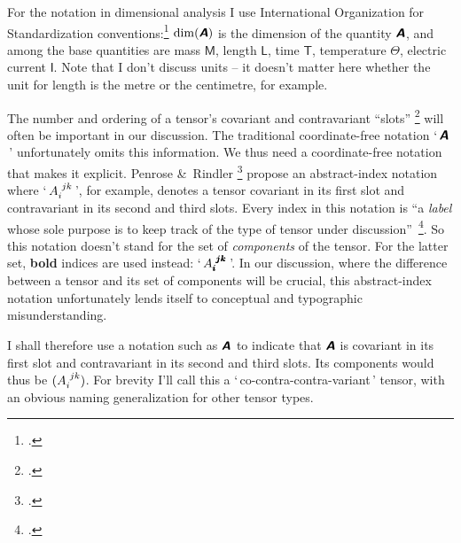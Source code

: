 \documentclass[a4paper,12pt,onecolumn,oneside,article,british]{memoir}
\makeatletter
\newcommand*{\defquote}[1]{`\,#1\,'}
\newcommand*{\mathte}[1]{\textbf{\textit{\textsf{#1}}}}
\newcommand*{\citep}{\footcites}
\newcommand*{\amp}{\&}
\newcommand*{\sect}{\S}%
\newcommand*{\q}{}%
\DeclareRobustCommand*{\q}{%
  \mathbin{\mathpalette\bigcdot@{}}%
}
\newcommand*{\bigcdot@scalefactor}{0.7}
\newcommand*{\bigcdot@widthfactor}{1.5}
\newcommand*{\bigcdot@}[2]{%
  \sbox0{$#1\vcenter{}$}%
  \sbox2{$#1\cdot\m@th$}%
  \hbox to \bigcdot@widthfactor\wd2{%
    \hfil
    \raise\ht0\hbox{%
      \scalebox{\bigcdot@scalefactor}{%
        \lower\ht0\hbox{$#1\bullet\m@th$}%
      }%
    }%
    \hfil
  }%
}
\newcommand*{\Le}{\textsf{L}}
\newcommand*{\Ti}{\textsf{T}}
\newcommand*{\Ma}{\textsf{M}}
\newcommand*{\Te}{\Theta}
\newcommand*{\Cu}{\textsf{I}}
\newcommand*{\yA}{\mathte{A}}
\renewcommand*{\i}{\indices}
\makeatother
\begin{document}
\bigskip

For the notation in dimensional analysis I use International Organization
for Standardization conventions:\citep[\sect~5]{iso2009} $\dim(\yA)$ is the
dimension of the quantity $\yA$, and among the base quantities are mass
$\Ma$, length $\Le$, time $\Ti$, temperature $\Te$, electric current $\Cu$.
Note that I don't discuss units -- it doesn't matter here whether the unit
for length is the metre or the centimetre, for example.

The number and ordering of a tensor's covariant and contravariant
\enquote{slots} \citep[\sect~3.2]{misneretal1970_r1973} will often be
important in our discussion. The traditional coordinate-free notation
\defquote{$\yA$} unfortunately omits this information. We thus need a
coordinate-free notation that makes it explicit. Penrose \amp\ Rindler
\citep[\sect~2.2]{penroseetal1984_r2003} propose an abstract-index notation
where \defquote{$A\i{_{i}^{jk}}$}, for example, denotes a tensor covariant
in its first slot and contravariant in its second and third slots. Every
index in this notation is \enquote{a \emph{label} whose sole purpose is to
  keep track of the type of tensor under
  discussion}~\citep[p.~75]{penroseetal1984_r2003}. So this notation
doesn't stand for the set of \emph{components} of the tensor. For the
latter set, \textbf{bold} indices are used instead:
\defquote{$A\i{_{\pmb{i}}^{\pmb{j}\pmb{k}}}$}. In our discussion, where the
difference between a tensor and its set of components will be crucial, this
abstract-index notation unfortunately lends itself to conceptual and
typographic misunderstanding.

I shall therefore use a notation such as $\yA\i{_{\q}^{\q\q}}$ to indicate
that $\yA$ is covariant in its first slot and contravariant in its second
and third slots. Its components would thus be $(A\i{_{i}^{jk}})$. For
brevity I'll call this a \defquote{co-contra-contra-variant} tensor, with
an obvious naming generalization for other tensor
types. %
\end{document}
